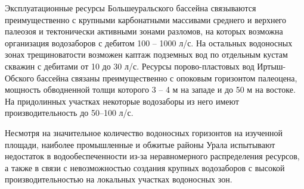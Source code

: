 \documentclass[a4paper,12pt]{article} %
\begin{document}
Эксплуатационные ресурсы Большеуральского бассейна связываются преимущественно с крупными карбонатными массивами среднего и верхнего палеозоя и тектонически активными зонами разломов, на которых возможна организация водозаборов с дебитом 100 – 1000 л/с. На остальных водоносных зонах трещиноватости возможен каптаж подземных вод по отдельным кустам скважин с дебитами от 10 до 30 л/с. Ресурсы порово-пластовых вод Иртыш-Обского бассейна связаны преимущественно с опоковым горизонтом палеоцена, мощность обводненной толщи которого 3 – 4 м на западе и до 50 м на востоке. На придолинных участках некоторые водозаборы из него имеют производительность до 50–100 л/с.

Несмотря на значительное количество водоносных горизонтов на изученной площади, наиболее промышленные и обжитые районы Урала испытывают недостаток в водообеспеченности из-за неравномерного распределения ресурсов, а также в связи с невозможностью создания крупных водозаборов с высокой производительностью на локальных участках водоносных зон.
\end{document}
